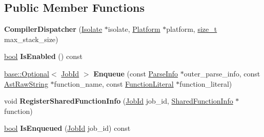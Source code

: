 \subsection*{Public Member Functions}
\begin{DoxyCompactItemize}
\item 
\mbox{\label{classv8_1_1internal_1_1CompilerDispatcher_a8520543854f45ee379a9c085197cee17}} 
{\bfseries Compiler\+Dispatcher} (\mbox{\hyperlink{classv8_1_1internal_1_1Isolate}{Isolate}} $\ast$isolate, \mbox{\hyperlink{classv8_1_1Platform}{Platform}} $\ast$platform, \mbox{\hyperlink{classsize__t}{size\+\_\+t}} max\+\_\+stack\+\_\+size)
\item 
\mbox{\label{classv8_1_1internal_1_1CompilerDispatcher_ae9306cbc6a9ef1527eccb4871055af5e}} 
\mbox{\hyperlink{classbool}{bool}} {\bfseries Is\+Enabled} () const
\item 
\mbox{\label{classv8_1_1internal_1_1CompilerDispatcher_a47ce0f2c454970903b71346f70fd38da}} 
\mbox{\hyperlink{classv8_1_1base_1_1Optional}{base\+::\+Optional}}$<$ \mbox{\hyperlink{classuintptr__t}{Job\+Id}} $>$ {\bfseries Enqueue} (const \mbox{\hyperlink{classv8_1_1internal_1_1ParseInfo}{Parse\+Info}} $\ast$outer\+\_\+parse\+\_\+info, const \mbox{\hyperlink{classv8_1_1internal_1_1AstRawString}{Ast\+Raw\+String}} $\ast$function\+\_\+name, const \mbox{\hyperlink{classv8_1_1internal_1_1FunctionLiteral}{Function\+Literal}} $\ast$function\+\_\+literal)
\item 
\mbox{\label{classv8_1_1internal_1_1CompilerDispatcher_aef003557ffb31a024eedcbd918f77278}} 
void {\bfseries Register\+Shared\+Function\+Info} (\mbox{\hyperlink{classuintptr__t}{Job\+Id}} job\+\_\+id, \mbox{\hyperlink{classv8_1_1internal_1_1SharedFunctionInfo}{Shared\+Function\+Info}} $\ast$function)
\item 
\mbox{\label{classv8_1_1internal_1_1CompilerDispatcher_ab951cb4354d748969fce3f8c72d72643}} 
\mbox{\hyperlink{classbool}{bool}} {\bfseries Is\+Enqueued} (\mbox{\hyperlink{classuintptr__t}{Job\+Id}} job\+\_\+id) const
\item 
\mbox{\label{classv8_1_1internal_1_1CompilerDispatcher_a3d5e718afdb5af49c3f224bd8a37a571}} 

\end{DoxyCompactItemize}
